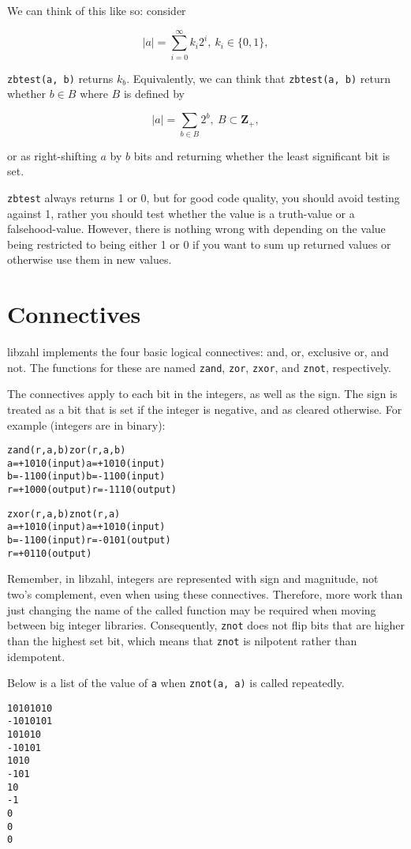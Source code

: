 We can think of this like so: consider

$$ \lvert a \rvert = \sum_{i = 0}^\infty k_i 2^i,~ k_i \in \{0, 1\}, $$

\noindent
{\tt zbtest(a, b)} returns $k_b$. Equivalently, we can
think that {\tt zbtest(a, b)} return whether $b \in B$
where $B$ is defined by

$$ \lvert a \rvert = \sum_{b \in B} 2^b,~ B \subset \textbf{Z}_+, $$

\noindent
or as right-shifting $a$ by $b$ bits and returning
whether the least significant bit is set.

{\tt zbtest} always returns 1 or 0, but for good
code quality, you should avoid testing against 1,
rather you should test whether the value is a
truth-value or a falsehood-value. However, there
is nothing wrong with depending on the value being
restricted to being either 1 or 0 if you want to
sum up returned values or otherwise use them in
new values.


\newpage
\section{Connectives}
\label{sec:Connectives}

libzahl implements the four basic logical
connectives: and, or, exclusive or, and not.
The functions for these are named {\tt zand},
{\tt zor}, {\tt zxor}, and {\tt znot},
respectively.

The connectives apply to each bit in the
integers, as well as the sign. The sign is
treated as a bit that is set if the integer
is negative, and as cleared otherwise. For
example (integers are in binary):

\begin{alltt}
   zand(r, a, b)              zor(r, a, b)
   a = +1010  (input)         a = +1010  (input)
   b = -1100  (input)         b = -1100  (input)
   r = +1000  (output)        r = -1110  (output)

   zxor(r, a, b)              znot(r, a)
   a = +1010  (input)         a = +1010  (input)
   b = -1100  (input)         r = -0101  (output)
   r = +0110  (output)
\end{alltt}

Remember, in libzahl, integers are represented
with sign and magnitude, not two's complement,
even when using these connectives. Therefore,
more work than just changing the name of the
called function may be required when moving
between big integer libraries. Consequently,
{\tt znot} does not flip bits that are higher
than the highest set bit, which means that
{\tt znot} is nilpotent rather than idempotent.

Below is a list of the value of {\tt a} when
{\tt znot(a, a)} is called repeatedly.

\begin{alltt}
   10101010
   -1010101
     101010
     -10101
       1010
       -101
         10
         -1
          0
          0
          0
\end{alltt}
